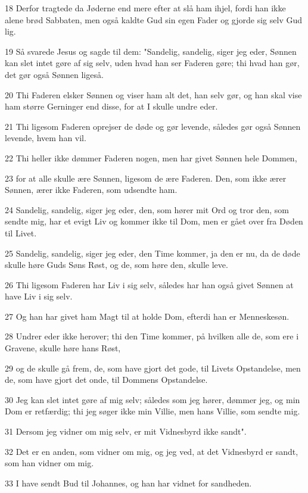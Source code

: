 \par 18 Derfor tragtede da Jøderne end mere efter at slå ham ihjel, fordi han ikke alene brød Sabbaten, men også kaldte Gud sin egen Fader og gjorde sig selv Gud lig.
\par 19 Så svarede Jesus og sagde til dem: "Sandelig, sandelig, siger jeg eder, Sønnen kan slet intet gøre af sig selv, uden hvad han ser Faderen gøre; thi hvad han gør, det gør også Sønnen ligeså.
\par 20 Thi Faderen elsker Sønnen og viser ham alt det, han selv gør, og han skal vise ham større Gerninger end disse, for at I skulle undre eder.
\par 21 Thi ligesom Faderen oprejser de døde og gør levende, således gør også Sønnen levende, hvem han vil.
\par 22 Thi heller ikke dømmer Faderen nogen, men har givet Sønnen hele Dommen,
\par 23 for at alle skulle ære Sønnen, ligesom de ære Faderen. Den, som ikke ærer Sønnen, ærer ikke Faderen, som udsendte ham.
\par 24 Sandelig, sandelig, siger jeg eder, den, som hører mit Ord og tror den, som sendte mig, har et evigt Liv og kommer ikke til Dom, men er gået over fra Døden til Livet.
\par 25 Sandelig, sandelig, siger jeg eder, den Time kommer, ja den er nu, da de døde skulle høre Guds Søns Røst, og de, som høre den, skulle leve.
\par 26 Thi ligesom Faderen har Liv i sig selv, således har han også givet Sønnen at have Liv i sig selv.
\par 27 Og han har givet ham Magt til at holde Dom, efterdi han er Menneskesøn.
\par 28 Undrer eder ikke herover; thi den Time kommer, på hvilken alle de, som ere i Gravene, skulle høre hans Røst,
\par 29 og de skulle gå frem, de, som have gjort det gode, til Livets Opstandelse, men de, som have gjort det onde, til Dommens Opstandelse.
\par 30 Jeg kan slet intet gøre af mig selv; således som jeg hører, dømmer jeg, og min Dom er retfærdig; thi jeg søger ikke min Villie, men hans Villie, som sendte mig.
\par 31 Dersom jeg vidner om mig selv, er mit Vidnesbyrd ikke sandt".
\par 32 Det er en anden, som vidner om mig, og jeg ved, at det Vidnesbyrd er sandt, som han vidner om mig.
\par 33 I have sendt Bud til Johannes, og han har vidnet for sandheden.
